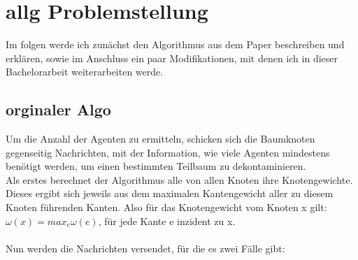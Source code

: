 \section{allg Problemstellung}
Im folgen werde ich zunächst den Algorithmus aus dem Paper beschreiben und erklären, sowie im Anschluss ein paar Modifikationen, mit denen ich in dieser Bachelorarbeit weiterarbeiten werde.



\subsection{orginaler Algo}
Um die Anzahl der Agenten zu ermitteln, schicken sich die Baumknoten gegenseitig Nachrichten, mit der Information, wie viele Agenten mindestens benötigt werden, um einen bestimmten Teilbaum zu dekontaminieren.
\\
Als erstes berechnet der Algorithmus alle von allen Knoten ihre Knotengewichte. Dieses ergibt sich jeweils aus dem maximalen Kantengewicht aller zu diesem Knoten führenden Kanten. Also für das Knotengewicht vom Knoten x gilt: $\omega(x) = max_{e} \omega(e)$, für jede Kante e inzident zu x.
\\
\\
Nun werden die Nachrichten versendet, für die es zwei Fälle gibt:

